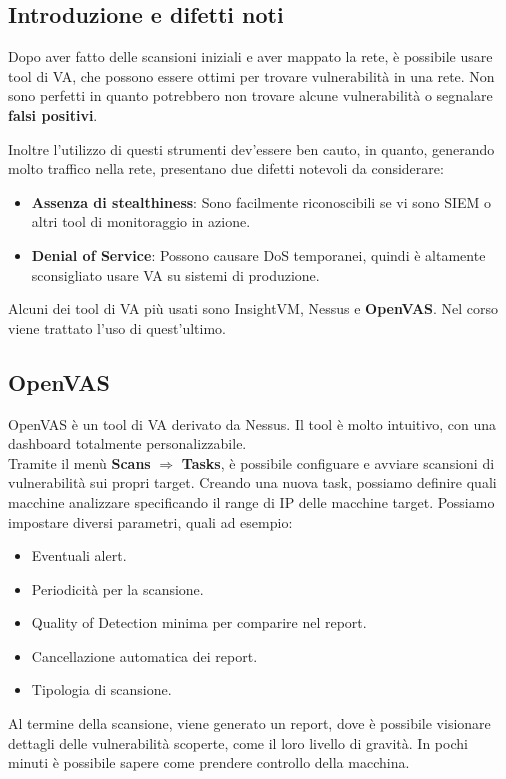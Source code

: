 \documentclass{article}
\begin{document}
\subsection{Introduzione e difetti noti}
Dopo aver fatto delle scansioni iniziali e aver mappato la rete, è possibile usare tool di VA, che possono essere ottimi per trovare vulnerabilità in una rete. Non sono perfetti in quanto potrebbero non trovare alcune vulnerabilità o segnalare \textbf{falsi positivi}.

Inoltre l'utilizzo di questi strumenti dev'essere ben cauto, in quanto, generando molto traffico nella rete, presentano due difetti notevoli da considerare:
\begin{itemize}
    \item \textbf{Assenza di stealthiness}: Sono facilmente riconoscibili se vi sono SIEM o altri tool di monitoraggio in azione. 
    \item \textbf{Denial of Service}: Possono causare DoS temporanei, quindi è altamente sconsigliato usare VA su sistemi di produzione. 
\end{itemize}

Alcuni dei tool di VA più usati sono InsightVM, Nessus e \textbf{OpenVAS}. 
Nel corso viene trattato l'uso di quest'ultimo.

\subsection{OpenVAS}
OpenVAS è un tool di VA derivato da Nessus. Il tool è molto intuitivo, con una dashboard totalmente personalizzabile.\\
Tramite il menù \textbf{Scans} $\Rightarrow$ \textbf{Tasks}, è possibile configuare e avviare scansioni di vulnerabilità sui propri target. Creando
una nuova task, possiamo definire quali macchine analizzare specificando il range di IP delle macchine target. Possiamo impostare diversi parametri, quali ad esempio:
\begin{itemize}
    \item Eventuali alert.
    \item Periodicità per la scansione.
    \item Quality of Detection minima per comparire nel report.
    \item Cancellazione automatica dei report.
    \item Tipologia di scansione.
\end{itemize}

Al termine della scansione, viene generato un report, dove è possibile visionare dettagli delle vulnerabilità scoperte, come il loro livello di gravità. In pochi minuti è possibile sapere come prendere controllo della macchina.
\end{document}
